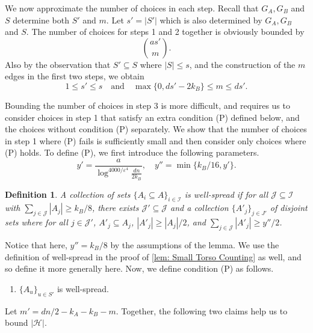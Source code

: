 \documentclass[11pt]{article}
\newcommand{\eps}{\varepsilon}
\theoremstyle{plain}
\newtheorem{definition}[thm]{Definition}
\begin{document}
    We now approximate the number of choices in each step. 
    Recall that $G_A,G_B$ and $S$ determine both $S'$ and $m$. Let $s'=|S'|$ which is also determined by $G_A,G_B$ and $S$.
    The
number of choices for  steps 1 and 2 together is obviously bounded by 
\begin{equation}\label{eq: steps 1 and 2 1}
        \binom{as'}{m}.
    \end{equation} 
 Also by the observation that $S'\subseteq S$ where $|S|\le s$, and the construction of the $m$
 edges in the first two steps, we obtain
\begin{equation}\label{eq: mS' relaxed 1}
       1 \leq s' \leq s \quad\text{and} \quad  \max\{0,ds' - 2k_B\} \leq m \leq ds'.
    \end{equation}

 
    
    Bounding the number of choices in step 3 is more difficult, and requires us to consider choices in step 1 that satisfy an extra condition (P) defined below, and the choices without condition (P) separately. We show that the number of choices in step 1 where (P) fails is sufficiently small and then consider only choices where (P) holds. To define (P), we first introduce the following parameters.
    \begin{equation}\label{eq: y',y''}
        y' = \frac{a}{\log^{4000/\eps^4}\frac{dn}{2k_B}}, \quad y'' = \min\{k_B/16, y'\}.
    \end{equation}
\begin{definition}\label{def: well-spread}
    A collection of sets $\{A_i \subseteq A\}_{i \in \mathcal I}$ is \textit{well-spread} if for all $\mathcal J \subseteq \mathcal I$ with $\sum_{j \in \mathcal J}|A_j| \geq k_B/8$, there exists $\mathcal J' \subseteq \mathcal J$ and a collection $\{A'_j\}_{j \in J'}$ of disjoint sets where for all $j \in \mathcal J'$, $A'_j \subseteq A_j$, $|A'_j| \geq |A_j|/2$, and $\sum_{j \in \mathcal J}|A'_j| \geq y''/2$.
\end{definition}
    
    Notice that here, $y'' = k_B/8$ by the assumptions of the lemma. We use the definition of well-spread in the proof of \cref{lem: Small Torso Counting} as well, and so define it more generally here. Now, we define condition (P) as follows.
    \begin{enumerate}
        \item[(P)] $\{A_u\}_{u \in S'}$ is well-spread.
    \end{enumerate}
    Let $m' = dn/2 - k_A - k_B - m$. Together, the following two claims help us to bound $|\mathcal H|$.
\end{document}
